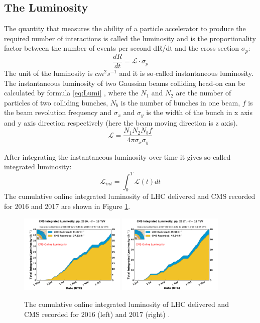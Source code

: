 \subsection{The Luminosity}\label{sec:LHC_luminosity}
The quantity that measures the ability of a particle accelerator to produce the required number of interactions is called the luminosity and is the proportionality factor
between the number of events per second dR/dt and the cross section $\sigma_{p}$:
\begin{equation}
\frac{dR}{dt}=\mathcal{L}\cdot\sigma_{p}
\label{eq:define_Lumi}
\end{equation}
The unit of the luminosity is $cm^{2}s^{-1}$ and it is so-called instantaneous luminosity.
The instantaneous luminosity of two Gaussian beams colliding head-on can be calculated by formula \ref{eq:Lumi} \cite{Herr2013}, where the $N_{1}$ and $N_{2}$ are the number of particles of two colliding bunches, $N_{b}$ is the number of bunches in one beam, $f$ is the beam revolution frequency and $\sigma_{x}$ and $\sigma_{y}$ is the width of the bunch in x axis and y axis direction respectively (here the beam moving direction is z axis).
\begin{equation}
\mathcal{L}=\frac{N_{1}N_{2}N_{b}f}{4\pi\sigma_{x}\sigma_{y}}
\label{eq:Lumi}
\end{equation}

After integrating the instantaneous luminosity over time it gives so-called integrated luminosity:
\begin{equation}
\mathcal{L}_{int}=\int_{0}^{T}\mathcal{L}(t)dt
\label{eq:Integrated_Lumi}
\end{equation}
The cumulative online integrated luminosity of LHC delivered and CMS recorded for 2016 and 2017 are shown in Figure \ref{fig:LHC_luminosity}.
\begin{figure}[h!]
\begin{center}
\includegraphics[width=0.45\textwidth]{figures/LHC/int_lumi_per_day_cumulative_pp_2016OnlineLumi.png}
\includegraphics[width=0.45\textwidth]{figures/LHC/int_lumi_per_day_cumulative_pp_2017OnlineLumi.png}
\caption{The cumulative online integrated luminosity of LHC delivered and CMS recorded for 2016 (left) and 2017 (right) \cite{CMS_Luminosity}.}
\label{fig:LHC_luminosity}
\end{center}
\end{figure}

